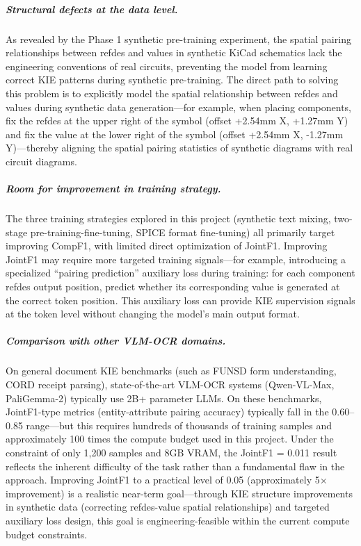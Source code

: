 \subparagraph{Structural defects at the data level.}
As revealed by the Phase 1 synthetic pre-training experiment, the spatial pairing relationships between refdes and values in synthetic KiCad schematics lack the engineering conventions of real circuits, preventing the model from learning correct KIE patterns during synthetic pre-training. The direct path to solving this problem is to explicitly model the spatial relationship between refdes and values during synthetic data generation---for example, when placing components, fix the refdes at the upper right of the symbol (offset +2.54mm X, +1.27mm Y) and fix the value at the lower right of the symbol (offset +2.54mm X, -1.27mm Y)---thereby aligning the spatial pairing statistics of synthetic diagrams with real circuit diagrams.

\subparagraph{Room for improvement in training strategy.}
The three training strategies explored in this project (synthetic text mixing, two-stage pre-training-fine-tuning, SPICE format fine-tuning) all primarily target improving CompF1, with limited direct optimization of JointF1. Improving JointF1 may require more targeted training signals---for example, introducing a specialized ``pairing prediction'' auxiliary loss during training: for each component refdes output position, predict whether its corresponding value is generated at the correct token position. This auxiliary loss can provide KIE supervision signals at the token level without changing the model's main output format.

\subparagraph{Comparison with other VLM-OCR domains.}
On general document KIE benchmarks (such as FUNSD form understanding, CORD receipt parsing), state-of-the-art VLM-OCR systems (Qwen-VL-Max, PaliGemma-2) typically use 2B+ parameter LLMs. On these benchmarks, JointF1-type metrics (entity-attribute pairing accuracy) typically fall in the 0.60--0.85 range---but this requires hundreds of thousands of training samples and approximately 100 times the compute budget used in this project. Under the constraint of only 1,200 samples and 8GB VRAM, the JointF1 = 0.011 result reflects the inherent difficulty of the task rather than a fundamental flaw in the approach. Improving JointF1 to a practical level of 0.05 (approximately 5$\times$ improvement) is a realistic near-term goal---through KIE structure improvements in synthetic data (correcting refdes-value spatial relationships) and targeted auxiliary loss design, this goal is engineering-feasible within the current compute budget constraints.

